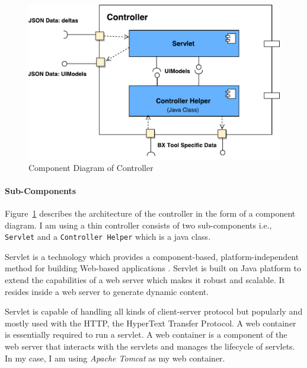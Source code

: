 \begin{figure}
	\includegraphics[width=1\textwidth]{figures/Component_Diagram-Controller}
	\caption{Component Diagram of Controller}
	\label{fig:Component_Diagram-Controller}
\end{figure}

\paragraph{Sub-Components}
Figure~\ref{fig:Component_Diagram-Controller} describes the architecture of the controller in the form of a component diagram. I am using a thin controller consists of two sub-components i.e., \texttt{Servlet} and a \texttt{Controller Helper} which is a java class.

Servlet is a technology which provides a component-based, platform-independent method for building Web-based applications \cite{servlet}. Servlet is built on Java platform to extend the capabilities of a web server which makes it robust and scalable. It resides inside a web server to generate dynamic content.

Servlet is capable of handling all kinds of client-server protocol but popularly and mostly used with the HTTP, the HyperText Transfer Protocol. A web container is essentially required to run a servlet. A web container is a component of the web server that interacts with the servlets and manages the lifecycle of servlets. In my case, I am using \textit{Apache Tomcat} as my web container. 

